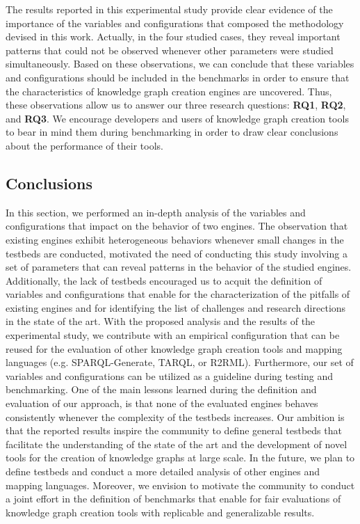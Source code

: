 The results reported in this experimental study provide clear evidence of the importance of the variables and configurations that composed the methodology devised in this work. Actually, in the four studied cases, they reveal important patterns that could not be observed whenever other parameters were studied simultaneously. Based on these observations, we can conclude that these variables and configurations should be included in the benchmarks in order to ensure that the characteristics of knowledge graph creation engines are uncovered. Thus, these observations allow us to answer our three research questions: \textbf{RQ1}, \textbf{RQ2}, and \textbf{RQ3}. We encourage developers and users of knowledge graph creation tools to bear in mind them during benchmarking in order to draw clear conclusions about the performance of their tools.


\subsection{Conclusions}
In this section, we performed an in-depth analysis of the variables and configurations that impact on the behavior of two engines. The observation that existing engines exhibit heterogeneous behaviors whenever small changes in the testbeds are conducted, motivated the need of conducting this study involving a set of parameters that can reveal patterns in the behavior of the studied engines. Additionally, the lack of testbeds encouraged us to acquit the definition of variables and configurations that enable for the characterization of the pitfalls of existing engines and for identifying the list of challenges and research directions in the state of the art. 
With the proposed analysis and the results of the experimental study, we contribute with an empirical configuration that can be reused for the evaluation of other knowledge graph creation tools and mapping languages (e.g. SPARQL-Generate, TARQL, or R2RML). Furthermore, our set of variables and configurations can be utilized as a guideline during testing and benchmarking. One of the main lessons learned during the definition and evaluation of our approach, is that none of the evaluated engines  behaves consistently whenever the complexity of the testbeds increases. Our ambition is that the reported results inspire the community to define general testbeds that facilitate the understanding of the state of the art and the development of novel tools for the creation of knowledge graphs at large scale.  In the future, we plan to define testbeds and conduct a more detailed analysis of other engines and mapping languages. Moreover, we envision to motivate the community to conduct a joint effort in the definition of benchmarks that enable for fair evaluations of knowledge graph creation tools with replicable and generalizable results. 
